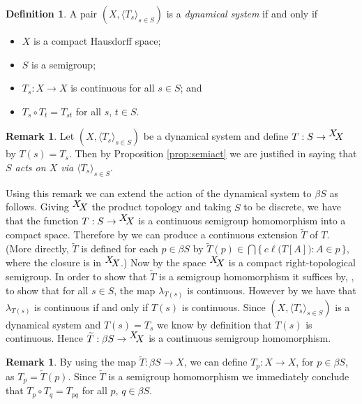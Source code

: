 \documentclass[12pt]{article}
\theoremstyle{plain}
\theoremstyle{definition}
\newtheorem{defn}[thm]{Definition}
\newtheorem{rmk}[thm]{Remark}
\newcommand{\la}{\langle}
\newcommand{\ra}{\rangle}
\newcommand{\ds}{(X, \la T_s \ra_{s\in S})}
\newcommand{\setfunc}[2]{\hbox{${}^{\hbox{$#1$}}\hskip -3 pt #2$}}
\begin{document}
  \begin{defn}
    A pair $\ds$ is a \textsl{dynamical system} if and only if
      \begin{itemize}
        \item[(1)] $X$ is a compact Hausdorff space;
        \item[(2)] $S$ is a semigroup;
        \item[(3)] $T_s : X \to X$ is continuous for all $s \in S$;
          and
        \item[(4)] $T_s \circ T_t = T_{st}$ for all $s$, $t \in S$.%
      \end{itemize}
  \end{defn}

  \begin{rmk}
    Let $\ds$ be a dynamical system and define $T : S \to
    \setfunc{X}{X}$ by $T(s) = T_s$.
    Then by Proposition \ref{prop:semiact} we are justified in saying
    that \textsl{$S$ acts on $X$ via $\la T_s \ra_{s \in S}$}.
  \end{rmk}

Using this remark we can extend the action of the dynamical system to
$\beta S$ as follows.
Giving $\setfunc{X}{X}$ the product topology and taking $S$ to be 
discrete, we have that the function $T :
S \to \setfunc{X}{X}$ is a continuous semigroup
homomorphism into a compact space.
Therefore by \cite[Theorem 3.27]{Hindman:1998fk} we can produce a
continuous extension $\widetilde{T}$ of $T$.
(More directly, $\widetilde{T}$ is defined for each $p \in \beta S$ by
$\widetilde{T}(p) \in \bigcap \{\, c\ell\bigl( T[A] \bigr) : A \in p \,\}$, where
the closure is in $\setfunc{X}{X}$.)
Now by \cite[Theorem 2.22(a)]{Hindman:1998fk} the space $\setfunc{X}{X}$ is
a compact right-topological semigroup.
In order to show that $\widetilde{T}$ is a semigroup homomorphism it
suffices by, \cite[Corollary 4.22]{Hindman:1998fk}, to show that for all
$s \in S$, the
map $\lambda_{T(s)}$ is continuous.
However by \cite[Theorem 2.2(b)]{Hindman:1998fk} we have that
$\lambda_{T(s)}$ is continuous if and only if $T(s)$ is continuous. 
Since $\ds$ is a dynamical system and $T(s) = T_s$ we know by
definition that $T(s)$ is continuous. 
Hence $\widetilde{T} : \beta S \to \setfunc{X}{X}$ is a continuous semigroup
homomorphism.

  \begin{rmk}
    By using the map $\widetilde{T} : \beta S \to X$, we can define
    $T_p : X \to X$, for $p \in \beta S$, as $T_p =
    \widetilde{T}(p)$. 
    Since $\widetilde{T}$ is a semigroup homomorphism we immediately
    conclude that $T_p \circ T_q = T_{pq}$ for all $p$, $q \in \beta
    S$.
   \end{rmk}
\end{document}
